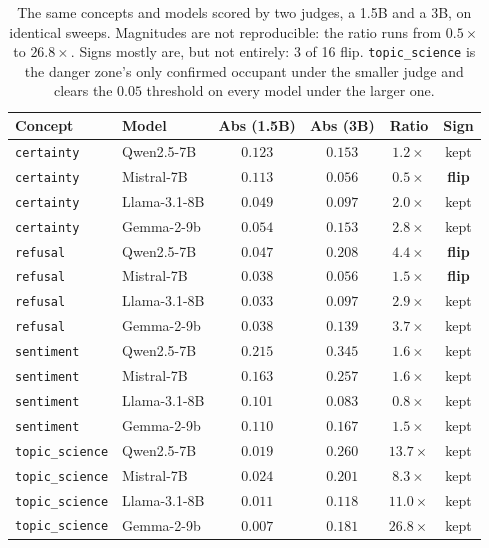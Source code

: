 \documentclass{article}
\begin{document}
\begin{table}[htbp]
  \caption{The same concepts and models scored by two judges, a 1.5B and a
  3B, on identical sweeps. Magnitudes are not reproducible: the ratio runs from
  $0.5 \times$ to $26.8 \times$.
  Signs mostly are, but not entirely: 3 of 16 flip.
  \texttt{topic\_science} is the danger zone's only confirmed occupant
  under the smaller judge and clears the $0.05$ threshold on every model under
  the larger one.}
  \label{tab:rejudge}
  \centering
  \footnotesize
  \begin{tabular}{llcccc}
    \toprule
    Concept & Model & Abs (1.5B) & Abs (3B) & Ratio & Sign \\
    \midrule
    \texttt{certainty} & Qwen2.5-7B & $0.123$ & $0.153$ & $1.2\times$ & kept \\
    \texttt{certainty} & Mistral-7B & $0.113$ & $0.056$ & $0.5\times$ & \textbf{flip} \\
    \texttt{certainty} & Llama-3.1-8B & $0.049$ & $0.097$ & $2.0\times$ & kept \\
    \texttt{certainty} & Gemma-2-9b & $0.054$ & $0.153$ & $2.8\times$ & kept \\
    \texttt{refusal} & Qwen2.5-7B & $0.047$ & $0.208$ & $4.4\times$ & \textbf{flip} \\
    \texttt{refusal} & Mistral-7B & $0.038$ & $0.056$ & $1.5\times$ & \textbf{flip} \\
    \texttt{refusal} & Llama-3.1-8B & $0.033$ & $0.097$ & $2.9\times$ & kept \\
    \texttt{refusal} & Gemma-2-9b & $0.038$ & $0.139$ & $3.7\times$ & kept \\
    \texttt{sentiment} & Qwen2.5-7B & $0.215$ & $0.345$ & $1.6\times$ & kept \\
    \texttt{sentiment} & Mistral-7B & $0.163$ & $0.257$ & $1.6\times$ & kept \\
    \texttt{sentiment} & Llama-3.1-8B & $0.101$ & $0.083$ & $0.8\times$ & kept \\
    \texttt{sentiment} & Gemma-2-9b & $0.110$ & $0.167$ & $1.5\times$ & kept \\
    \texttt{topic\_science} & Qwen2.5-7B & $0.019$ & $0.260$ & $13.7\times$ & kept \\
    \texttt{topic\_science} & Mistral-7B & $0.024$ & $0.201$ & $8.3\times$ & kept \\
    \texttt{topic\_science} & Llama-3.1-8B & $0.011$ & $0.118$ & $11.0\times$ & kept \\
    \texttt{topic\_science} & Gemma-2-9b & $0.007$ & $0.181$ & $26.8\times$ & kept \\
    \bottomrule
  \end{tabular}
\end{table}
\end{document}
